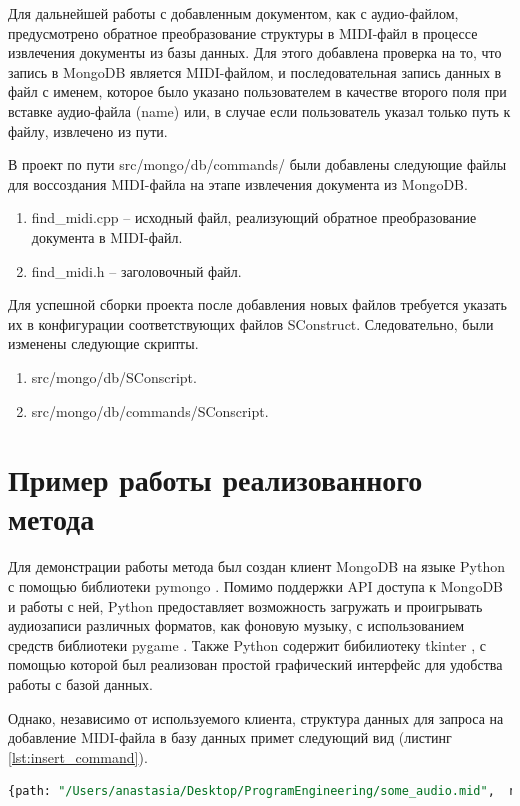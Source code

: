 Для дальнейшей работы с добавленным документом, как с аудио-файлом, предусмотрено обратное преобразование структуры в MIDI-файл в процессе извлечения документы из базы данных. Для этого добавлена проверка на то, что запись в MongoDB является MIDI-файлом, и последовательная запись данных в файл с именем, которое было указано пользователем в качестве второго поля при вставке аудио-файла (name) или, в случае если пользователь указал только путь к файлу, извлечено из пути.

В проект по пути src/mongo/db/commands/ были добавлены следующие файлы для воссоздания MIDI-файла на этапе извлечения документа из MongoDB.
\begin{enumerate}
\item find\_midi.cpp -- исходный файл, реализующий обратное преобразование документа в MIDI-файл.
\item find\_midi.h -- заголовочный файл.
\end{enumerate}

Для успешной сборки проекта после добавления новых файлов требуется указать их в конфигурации соответствующих файлов SConstruct. Следовательно, были изменены следующие скрипты.
\begin{enumerate}
\item src/mongo/db/SConscript.
\item src/mongo/db/commands/SConscript.
\end{enumerate}

\section{Пример работы реализованного метода}

Для демонстрации работы метода был создан клиент MongoDB на языке Python с помощью библиотеки pymongo \cite{PyMongo}. Помимо поддержки API доступа к MongoDB и работы с ней, Python предоставляет возможность загружать и проигрывать аудиозаписи различных форматов, как фоновую музыку, с использованием средств библиотеки pygame \cite{PyGame}. Также Python содержит бибилиотеку tkinter \cite{Tk}, с помощью которой был реализован простой графический интерфейс для удобства работы с базой данных.

Однако, независимо от используемого клиента, структура данных для запроса на добавление MIDI-файла в базу данных примет следующий вид (листинг \ref{lst:insert_command}).

\begin{lstlisting}[language=sql, label=some-code, caption=Данные для запроса на добавление MIDI-файла в MongoDB, label=lst:insert_command]
{path: "/Users/anastasia/Desktop/ProgramEngineering/some_audio.mid",  name:"my_audio"}
\end{lstlisting}


